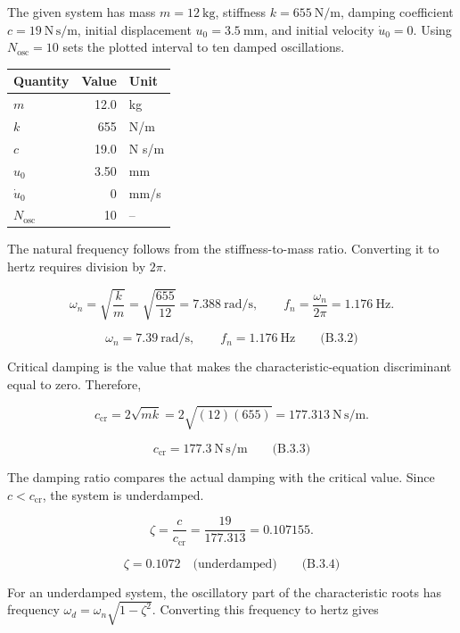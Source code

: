 \begingroup
\setlength{\abovedisplayskip}{6pt}
\setlength{\belowdisplayskip}{6pt}
\setlength{\abovedisplayshortskip}{4pt}
\setlength{\belowdisplayshortskip}{4pt}
\setlength{\intextsep}{6pt}

The given system has mass $m=12\ \mathrm{kg}$, stiffness $k=655\ \mathrm{N/m}$, damping coefficient $c=19\ \mathrm{N\,s/m}$, initial displacement $u_0=3.5\ \mathrm{mm}$, and initial velocity $\dot{u}_0=0$. Using $N_{\mathrm{osc}}=10$ sets the plotted interval to ten damped oscillations.

{ %
\begin{center}\small\begin{tabular}{@{}lrl@{}}
\toprule\noalign{}
Quantity & Value & Unit \\
\midrule\noalign{}
$m$ & 12.0 & kg \\
$k$ & 655 & N/m \\
$c$ & 19.0 & N s/m \\
$u_0$ & 3.50 & mm \\
$\dot{u}_0$ & 0 & mm/s \\
$N_{\mathrm{osc}}$ & 10 & -- \\
\bottomrule\end{tabular}\end{center}
}

The natural frequency follows from the stiffness-to-mass ratio. Converting it to hertz requires division by $2\pi$.

\[
\omega_n=\sqrt{\frac{k}{m}}=\sqrt{\frac{655}{12}}=7.388\ \mathrm{rad/s},
\qquad
f_n=\frac{\omega_n}{2\pi}=1.176\ \mathrm{Hz}.
\]

\[
\boxed{\omega_n=7.39\ \mathrm{rad/s},\qquad f_n=1.176\ \mathrm{Hz}}
\qquad\text{(B.3.2)}
\]

Critical damping is the value that makes the characteristic-equation discriminant equal to zero. Therefore,

\[
c_{\mathrm{cr}}=2\sqrt{mk}=2\sqrt{(12)(655)}=177.313\ \mathrm{N\,s/m}.
\]

\[
\boxed{c_{\mathrm{cr}}=177.3\ \mathrm{N\,s/m}}
\qquad\text{(B.3.3)}
\]

The damping ratio compares the actual damping with the critical value. Since $c<c_{\mathrm{cr}}$, the system is underdamped.

\[
\zeta=\frac{c}{c_{\mathrm{cr}}}=\frac{19}{177.313}=0.107155.
\]

\[
\boxed{\zeta=0.1072\quad\text{(underdamped)}}
\qquad\text{(B.3.4)}
\]

For an underdamped system, the oscillatory part of the characteristic roots has frequency $\omega_d=\omega_n\sqrt{1-\zeta^2}$. Converting this frequency to hertz gives

